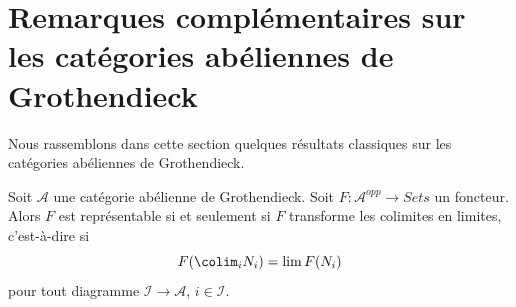 






\section{Remarques complémentaires sur les catégories abéliennes de
Grothendieck}
\label{section-additional-Grothendieck}

\noindent
Nous rassemblons dans cette section quelques résultats classiques sur les
catégories abéliennes de Grothendieck.

\begin{lemma}
\label{lemma-grothendieck-brown}
Soit $\mathcal{A}$ une catégorie abélienne de Grothendieck.
Soit $F : \mathcal{A}^{opp} \to \textit{Sets}$ un foncteur.
Alors $F$ est représentable si et seulement si $F$ transforme les colimites
en limites, c'est-à-dire si
$$
F(\colim_i N_i) = \lim F(N_i)
$$
pour tout diagramme $\mathcal{I} \to \mathcal{A}$, $i \in \mathcal{I}$.
\end{lemma}

